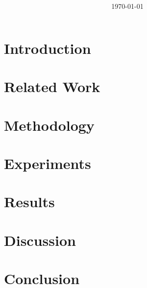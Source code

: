 \documentclass[11pt,a4paper]{article}
\title{
}
\author{
}
\date{\today}
\begin{document}
\maketitle

\begin{abstract}
\end{abstract}

\section{Introduction}

\section{Related Work}

\section{Methodology}

\section{Experiments}

\section{Results}

\section{Discussion}

\section{Conclusion}


\end{document}
